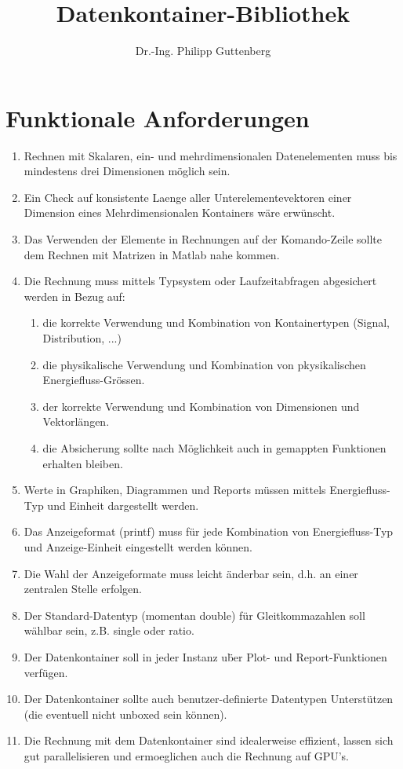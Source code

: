 \documentclass[11pt]{article}
\title{Datenkontainer-Bibliothek}
\author{Dr.-Ing. Philipp Guttenberg}
\begin{document}
\maketitle

\section{Funktionale Anforderungen}

\begin{enumerate}
\item Rechnen mit Skalaren, ein- und mehrdimensionalen Datenelementen muss bis mindestens drei Dimensionen m\"oglich sein.
\item Ein Check auf konsistente Laenge aller Unterelementevektoren einer Dimension eines Mehrdimensionalen Kontainers w\"are erw\"unscht. 
\item Das Verwenden der Elemente in Rechnungen auf der Komando-Zeile sollte dem Rechnen mit Matrizen in Matlab nahe kommen.
\item Die Rechnung muss mittels Typsystem oder Laufzeitabfragen abgesichert werden in Bezug auf:
  \begin {enumerate}
  \item die korrekte Verwendung und Kombination von Kontainertypen (Signal, Distribution, ...) 
  \item die physikalische Verwendung und Kombination von pkysikalischen Energiefluss-Gr\"ossen.
  \item der korrekte Verwendung und Kombination von Dimensionen und Vektorl\"angen.
  \item die Absicherung sollte nach M\"oglichkeit auch in gemappten Funktionen erhalten bleiben.   
  \end{enumerate} 
\item Werte in Graphiken, Diagrammen und Reports m\"ussen mittels Energiefluss-Typ und Einheit dargestellt werden.
\item Das Anzeigeformat (printf) muss f\"ur jede Kombination von Energiefluss-Typ und Anzeige-Einheit eingestellt werden k\"onnen.
\item Die Wahl der Anzeigeformate muss leicht \"anderbar sein, d.h. an einer zentralen Stelle erfolgen.
\item Der Standard-Datentyp (momentan double) f\"ur Gleitkommazahlen soll w\"ahlbar sein, z.B. single oder ratio.
\item Der Datenkontainer soll in jeder Instanz u\"ber Plot- und Report-Funktionen verf\"ugen.
\item Der Datenkontainer sollte auch benutzer-definierte Datentypen Unterst\"utzen (die eventuell nicht unboxed sein k\"onnen).
\item Die Rechnung mit dem Datenkontainer sind idealerweise effizient, lassen sich gut parallelisieren und ermoeglichen auch die Rechnung auf GPU's. 

\end{enumerate}
\end{document}
